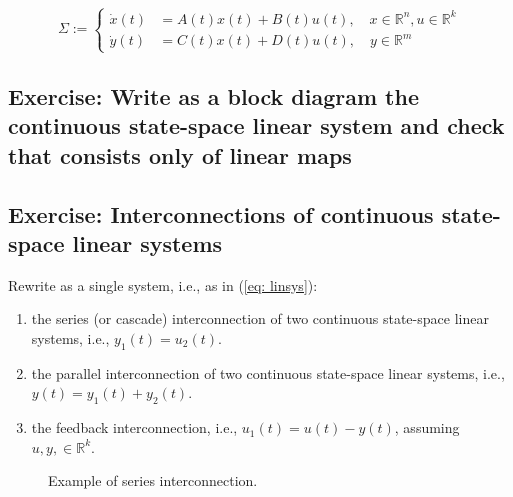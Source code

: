 \begin{equation}
	\Sigma := \begin{cases}
	\dot x(t) &= A(t)x(t) + B(t)u(t), \quad x\in\mathbb{R}^n, u\in\mathbb{R}^k \\
	\dot y(t) &= C(t)x(t) + D(t)u(t), \quad y\in\mathbb{R}^m
	\end{cases}
	\label{eq: linsys}
\end{equation}

\subsection{Exercise: Write as a block diagram the continuous state-space linear system and check that consists only of linear maps}

\subsection{Exercise: Interconnections of continuous state-space linear systems}
Rewrite as a single system, i.e., as in (\ref{eq: linsys}):

\begin{enumerate}
	\item the series (or cascade) interconnection of two continuous state-space linear systems, i.e., $y_1(t) = u_2(t)$.
	\item the parallel interconnection of two continuous state-space linear systems, i.e., $y(t) = y_1(t) + y_2(t)$.
	\item the feedback interconnection, i.e., $u_1(t) = u(t) - y(t)$, assuming $u, y, \in\mathbb{R}^k$.
\end{enumerate}

\begin{figure}
\centering
{}
	\caption{Example of series interconnection.}
	\label{fig: series}
\end{figure}

